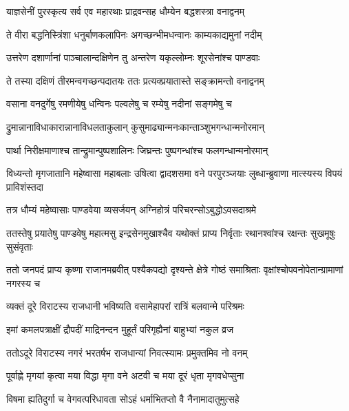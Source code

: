 \twolineshloka
{याज्ञसेनीं पुरस्कृत्य सर्व एव महारथाः}
{प्राद्रवन्सह धौम्येन बद्धशस्त्रा वनाद्वनम्}


\twolineshloka
{ते वीरा बद्धनिस्त्रिंशा धनुर्बाणकलापिनः}
{अगच्छन्भीमधन्वानः काम्यकाद्यमुनां नदीम्}


\twolineshloka
{उत्तरेण दशार्णानां पाञ्चालान्दक्षिणेन तु}
{अन्तरेण यकृल्लोम्नः शूरसेनांश्च पाण्डवाः}


\twolineshloka
{ते तस्या दक्षिणं तीरमन्वगच्छन्पदातयः}
{ततः प्रत्यक्प्रयातास्ते सङ्क्रामन्तो वनाद्वनम्}


\twolineshloka
{वसाना वनदुर्गेषु रमणीयेषु धन्विनः}
{पल्वलेषु च रम्येषु नदीनां सङ्गमेषु च}


\twolineshloka
{द्रुमान्नानाविधाकारान्नानाविधलताकुलान्}
{कुसुमाढ्यान्मनःकान्ताञ्शुभगन्धान्मनोरमान्}


\twolineshloka
{पार्था निरीक्षमाणाश्च तान्द्रुमान्पुष्पशालिनः}
{जिघ्रन्तः पुष्पगन्धांश्च फलगन्धान्मनोरमान्}


\threelineshloka
{विध्यन्तो मृगजातानि महेष्वासा महाबलाः}
{उषित्वा द्वादशसमा वने परपुरञ्जयाः}
{लुब्धान्ब्रुवाणा मात्स्यस्य विपयं प्राविशंस्तदा}


\twolineshloka
{तत्र धौम्यं महेष्वासाः पाण्डवेया व्यसर्जयन्}
{अग्निहोत्रं परिचरन्सोऽबुद्धोऽवसदाश्रमे}


\threelineshloka
{ततस्तेषु प्रयातेषु पाण्डवेषु महात्मसु}
{इन्द्रसेनमुखाश्चैव यथोक्तं प्राप्य निर्वृताः}
{रथानश्वांश्च रक्षन्तः सुखमूषुः सुसंवृताः}


\onelineshloka
{ततो जनपदं प्राप्य कृष्णा राजानमब्रवीत्}
\twolineshloka
{पश्यैकपद्यो दृश्यन्ते क्षेत्रे गोष्ठं समाश्रिताः}
{वृक्षांश्चोपवनोपेतान्ग्रामाणां नगरस्य च}


\twolineshloka
{व्यक्तं दूरे विराटस्य राजधानी भविष्यति}
{वसामेहापरां रात्रिं बलवान्मे परिश्रमः}




\twolineshloka
{इमां कमलपत्राक्षीं द्रौपदीं माद्रिनन्दन}
{मुहूर्तं परिगृह्यैनां बाहुभ्यां नकुल व्रज}


\twolineshloka
{ततोऽदूरे विराटस्य नगरं भरतर्षभ}
{राजधान्यां निवत्स्यामः प्रमुक्तमिव नो वनम्}




\twolineshloka
{पूर्वाह्णे मृगयां कृत्वा मया विद्धा मृगा वने}
{अटवी च मया दूरं धृता मृगवधेप्सुना}


\twolineshloka
{विषमा ह्यतिदुर्गा च वेगवत्परिधावता}
{सोऽहं धर्माभितप्तो वै नैनामादातुमुत्सहे}

